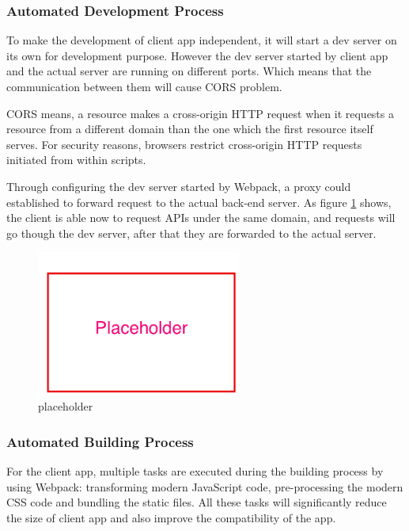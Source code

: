 \subsubsection{Automated Development Process}
To make the development of client app independent, it will start a dev server on its own for development purpose. However the dev server started by client app and the actual server are running on different ports. Which means that the communication between them will cause CORS problem.

CORS means, a resource makes a cross-origin HTTP request when it requests a resource from a different domain than the one which the first resource itself serves. For security reasons, browsers restrict cross-origin HTTP requests initiated from within scripts. \cite{CORS}

Through configuring the dev server started by Webpack, a proxy could established to forward request to the actual back-end server. As figure \ref{fig:proxy-server-imp} shows, the client is able now to request APIs under the same domain, and requests will go though the dev server, after that they are forwarded to the actual server.

\begin{figure}[!htbp]
  \centering
    \includegraphics[width=0.6\textwidth]{Figures/placeholder.png}
  \caption{placeholder}
  \label{fig:proxy-server-imp}
\end{figure}


\subsubsection{Automated Building Process}

For the client app, multiple tasks are executed during the building process by using Webpack: transforming modern JavaScript code, pre-processing the modern CSS code and bundling the static files. All these tasks will significantly reduce the size of client app and also improve the compatibility of the app.

